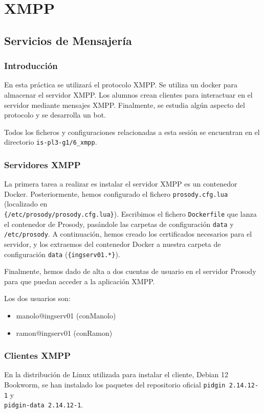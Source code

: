 \chapter{XMPP}\label{chap:6}
\section{Servicios de Mensajería}
\subsection{Introducción}

En esta práctica se utilizará el protocolo XMPP{.}
Se utiliza un docker para almacenar el servidor XMPP{.}
Los alumnos crean clientes para interactuar en el servidor mediante mensajes XMPP{.}
Finalmente, se estudia algún aspecto del protocolo y se desarrolla un bot.

\begin{notebox}
Todos los ficheros y configuraciones relacionadas a esta sesión se encuentran en el directorio
\Verb#is-pl3-g1/6_xmpp#.
\end{notebox}

\subsection{Servidores XMPP}
La primera tarea a realizar es instalar el servidor XMPP es un contenedor Docker.
Posteriormente, hemos configurado el fichero \Verb#prosody.cfg.lua#
(localizado en \\ \Verb#{/etc/prosody/prosody.cfg.lua}#).
Escribimos el fichero \lstinline{Dockerfile} que lanza el contenedor de Prosody,
pasándole las carpetas de configuración \Verb#data# y \Verb#/etc/prosody#.
A continuación, hemos creado los certificados necesarios para el servidor, y los extraemos
del contenedor Docker a nuestra carpeta de configuración \Verb#data# (\Verb#{ingserv01.*}#).

Finalmente, hemos dado de alta a dos cuentas de usuario en el servidor Prosody
para que puedan acceder a la aplicación XMPP{.}

Los dos usuarios son:
\begin{itemize}[itemsep=0.10px]
    \item manolo@ingserv01 (conManolo)
    \item ramon@ingserv01 (conRamon)
\end{itemize}

\subsection{Clientes XMPP}
En la distribución de Linux utilizada para instalar el cliente, Debian 12 Bookworm,
se han instalado los paquetes del repositorio oficial 
\Verb#pidgin 2.14.12-1# y \\ \Verb#pidgin-data 2.14.12-1#.

